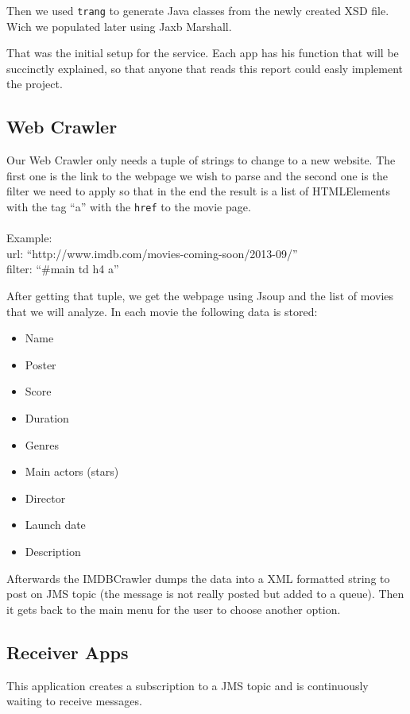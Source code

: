 \documentclass[a4paper]{article}
\begin{document}
Then we used \texttt{trang} to generate Java classes from the newly created XSD file. Wich we populated later using Jaxb Marshall.

That was the initial setup for the service. Each app has his function that will be succinctly explained, so that anyone that reads this report could easly implement the project.

\subsection{Web Crawler}
\indent \indent Our Web Crawler only needs a tuple of strings to change to a new website. The first one is the link to the webpage we wish to parse and the second one is the filter we need to apply so that in the end the result is a list of HTMLElements with the tag ``a'' with the \texttt{href} to the movie page.\\
\\Example:\\url: ``http://www.imdb.com/movies-coming-soon/2013-09/''\\filter: ``\#main td h4 a''

After getting that tuple, we get the webpage using Jsoup and the list of movies that we will analyze. In each movie the following data is stored:

\begin{itemize}
	\item Name
	\item Poster
	\item Score
	\item Duration
	\item Genres
	\item Main actors (stars)
	\item Director
	\item Launch date
	\item Description
\end{itemize}

Afterwards the IMDBCrawler dumps the data into a XML formatted string to post on JMS topic (the message is not really posted but added to a queue). Then it gets back to the main menu for the user to choose another option.

\subsection{Receiver Apps}
\indent \indent This application creates a subscription to a JMS topic and is continuously waiting to receive messages.
\end{document}
